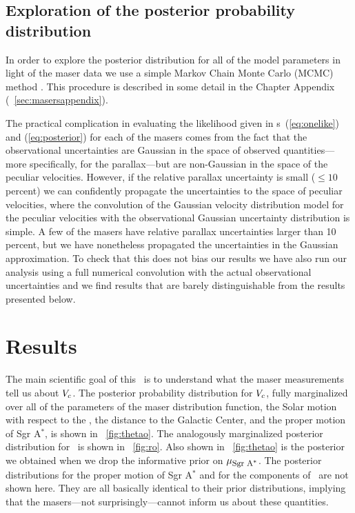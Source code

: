 \subsection{Exploration of the posterior probability distribution}

In order to explore the posterior distribution for all of the model
parameters in light of the maser data we use a simple Markov Chain
Monte Carlo (MCMC) method \citep{mackay}. This procedure is described
in some detail in the Chapter Appendix
(\sectionname~\ref{sec:masersappendix}).

The practical complication in evaluating the likelihood given in
\eqnname s~(\ref{eq:onelike}) and (\ref{eq:posterior}) for each of the
masers comes from the fact that the observational uncertainties are
Gaussian in the space of observed quantities---more specifically, for
the parallax---but are non-Gaussian in the space of the peculiar
velocities. However, if the relative parallax uncertainty is small
($\leq 10$\,percent) we can confidently propagate the uncertainties to
the space of peculiar velocities, where the convolution of the
Gaussian velocity distribution model for the peculiar velocities with
the observational Gaussian uncertainty distribution is simple. A few
of the masers have relative parallax uncertainties larger than
10\,percent, but we have nonetheless propagated the uncertainties in
the Gaussian approximation. To check that this does not bias our
results we have also run our analysis using a full numerical
convolution with the actual observational uncertainties and we find
results that are barely distinguishable from the results presented
below.


\section{Results}\label{sec:results}

The main scientific goal of this \chaptername\ is to understand what
the maser measurements tell us about $V_c$. The posterior probability
distribution for $V_c$, fully marginalized over all of the parameters
of the maser distribution function, the Solar motion with respect to
the \lsr, the distance to the Galactic Center, and the proper motion
of Sgr A$^*$, is shown in \figurename~\ref{fig:thetao}. The
analogously marginalized posterior distribution for \Ro\ is shown in
\figurename~\ref{fig:ro}. Also shown in \figurename~\ref{fig:thetao}
is the posterior we obtained when we drop the informative prior on
$\mu_{\mbox{{\footnotesize Sgr A$^*$}}}$. The posterior distributions for the proper motion of Sgr
A$^*$ and for the components of \vsunlsr\ are not shown here. They are
all basically identical to their prior distributions, implying that
the masers---not surprisingly---cannot inform us about these
quantities.


